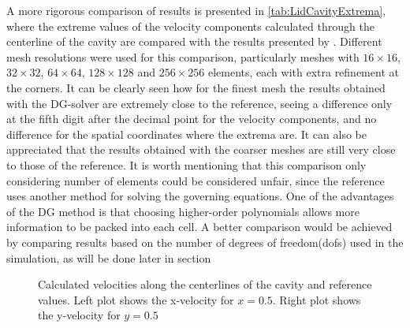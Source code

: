 A more rigorous comparison of results is presented in \cref{tab:LidCavityExtrema}, where the extreme values of the velocity components calculated through the centerline of the cavity are compared with the results presented by \textcite{botellaBenchmarkSpectralResults1998}. Different mesh resolutions were used for this comparison, particularly meshes with $16\times16$, $32\times32$, $64\times64$, $128\times128$ and $256\times256$ elements, each with extra refinement at the corners. It can be clearly seen how for the finest mesh the results obtained with the DG-solver are extremely close to the reference, seeing a difference only at the fifth digit after the decimal point for the velocity components, and no difference for the spatial coordinates where the extrema are. It can also be appreciated that the results obtained with the coarser meshes are still very close to those of the reference. It is worth mentioning that this comparison only considering number of elements could be considered unfair, since the reference uses another method for solving the governing equations. One of the advantages of the DG method is that choosing higher-order polynomials allows more information to be packed into each cell. A better comparison would be achieved by comparing results based on the number of degrees of freedom(dofs) used in the simulation, as will be done later in section %

\begin{figure}[tb]
	\caption{Calculated velocities along the centerlines of the cavity and reference values. Left plot shows the x-velocity for $x = 0.5$. Right plot shows the y-velocity for $y = 0.5$  }
	\label{fig:LidVelocities}
\end{figure}

